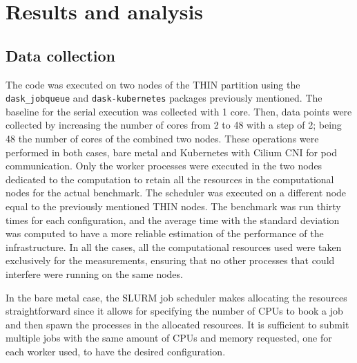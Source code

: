 \section{Results and analysis}\label{sec:daskresults}
\subsection{Data collection}\label{sec:daskresults}

The code was executed on two nodes of the THIN partition using the
\texttt{dask\_jobqueue} and \texttt{dask-kubernetes} packages previously
mentioned. The baseline for the serial execution was collected with 1 core.
Then, data points were collected by increasing the number of cores from 2 to 48
with a step of 2; being 48 the number of cores of the combined two nodes.
These operations were performed in both cases, bare metal and Kubernetes with
Cilium CNI for pod communication.
Only the worker processes were executed in the two nodes dedicated to the
computation to retain all the resources in the computational nodes for the
actual benchmark.
The scheduler was executed on a different node equal to the previously mentioned
THIN nodes.
The benchmark was run thirty times for each configuration, and the average time
with the standard deviation was computed to have a more reliable estimation of
the performance of the infrastructure.
In all the cases, all the computational resources used were taken exclusively
for the measurements, ensuring that no other processes that could interfere were
running on the same nodes.

In the bare metal case, the SLURM job scheduler makes allocating the resources
straightforward since it allows for specifying the number of CPUs to book a job
and then spawn the processes in the allocated resources. It is sufficient to
submit multiple jobs with the same amount of CPUs and memory requested, one for
each worker used, to have the desired configuration.

